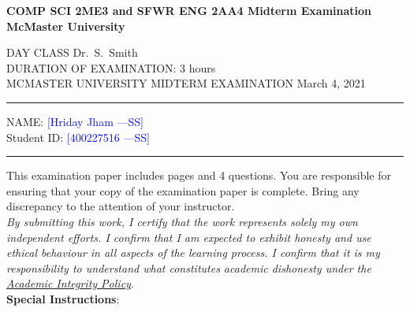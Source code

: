\documentclass[12pt,fleqn]{examtst}
\newcommand{\authornote}[3]{\textcolor{#1}{[#3 ---#2]}}
\newcommand{\authornote}[3]{}
\newcommand{\wss}[1]{\authornote{blue}{SS}{#1}}
\begin{document}
\newcommand{\soln}{n} %

\lstset{language=python, basicstyle=\ttfamily, breaklines=true,
  showspaces=false, showstringspaces=false, breakatwhitespace=true}

\newcommand{\codeit}[1]{\texttt{\textit{#1}}}

\begin{center}
  {\large \bf COMP SCI 2ME3 and SFWR ENG 2AA4 Midterm Examination}\\[1ex]
  {\large \bf McMaster University}\\[1ex]
  \ifthenelse{\equal{\soln}{y}}{\large {\bf ANSWER KEY} %
  }{}
\end{center}

\medskip

\noindent
DAY CLASS%
\hfill Dr.~S.~Smith \\
DURATION OF EXAMINATION: 3 hours \\
MCMASTER UNIVERSITY MIDTERM EXAMINATION \hfill March 4, 2021

\medskip

\noindent
\rule[3 mm]{\textwidth}{0.5mm}


NAME: \wss{Hriday Jham}\\[1ex]

Student ID: \wss{400227516} \\[2mm]

\noindent
\rule[3 mm]{\textwidth}{0.5mm}

This examination paper includes \noofpages pages and
4 %
questions. You are responsible for ensuring that your copy of the examination
paper is complete. Bring any discrepancy to the attention
of your instructor.\\

\noindent
\emph{By submitting this work, I certify that the work represents solely my own
independent efforts. I confirm that I am expected to exhibit honesty and use
ethical behaviour in all aspects of the learning process.  I confirm that it is
my responsibility to understand what constitutes academic dishonesty under the
\href{https://secretariat.mcmaster.ca/app/uploads/Academic-Integrity-Policy-1-1.pdf}
{Academic Integrity Policy}}.\\

\noindent
\textbf{Special Instructions}:
\end{document}
